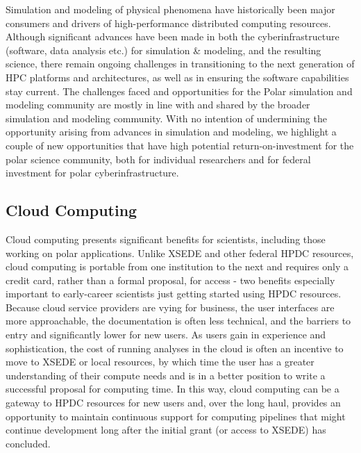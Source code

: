 \documentclass[10pt,letterpaper,draft]{article}
\begin{document}
Simulation and modeling of physical phenomena have historically been major consumers and drivers of high-performance distributed computing resources. Although significant advances have been made in both the cyberinfrastructure (software, data analysis etc.) for simulation & modeling, and the resulting science, there remain ongoing challenges in transitioning to the next generation of HPC platforms and architectures, as well as in ensuring the software capabilities stay current. The challenges faced and opportunities for the Polar simulation and modeling community are mostly in line with and shared by the broader simulation and modeling community. With no intention of undermining the opportunity arising from advances in simulation and modeling, we highlight a couple of new opportunities that have high potential return-on-investment for the polar science community, both for individual researchers and for federal investment for polar cyberinfrastructure.

\subsection*{Cloud Computing}
Cloud computing presents significant benefits for scientists, including those working on polar applications. Unlike XSEDE and other federal HPDC resources, cloud computing is portable from one institution to the next and requires only a credit card, rather than a formal proposal, for access - two benefits especially important to early-career scientists just getting started using HPDC resources. Because cloud service providers are vying for business, the user interfaces are more approachable, the documentation is often less technical, and the barriers to entry and significantly lower for new users. As users gain in experience and sophistication, the cost of running analyses in the cloud is often an incentive to move to XSEDE or local resources, by which time the user has a greater understanding of their compute needs and is in a better position to write a successful proposal for computing time. In this way, cloud computing can be a gateway to HPDC resources for new users and, over the long haul, provides an opportunity to maintain continuous support for computing pipelines that might continue development long after the initial grant (or access to XSEDE) has concluded. 
\end{document}
